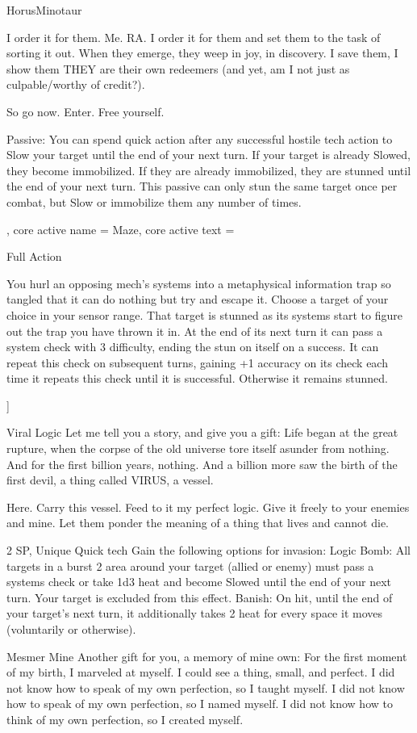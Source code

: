 \begin{mech}{Horus}{Minotaur}
{I order it for them. Me. RA. I order it for them and set them to the task of sorting it out. When they emerge, they weep in joy, in discovery. I save them, I show them THEY are their own redeemers (and yet, am I not just as culpable/worthy of credit?).

So go now. Enter. Free yourself.


Passive: You can spend quick action after any successful hostile tech action to Slow your target until the end of your next turn. If your target is already Slowed, they become immobilized. If they are already immobilized, they are stunned until the end of your next turn. This passive can only stun the same target once per combat, but Slow or immobilize them any number of times.
},
core active name = Maze,
core active text = {Full Action

You hurl an opposing mech’s systems into a metaphysical information trap so tangled that it can do nothing but try and escape it. Choose a target of your choice in your sensor range. That target is stunned as its systems start to figure out the trap you have thrown it in. At the end of its next turn it can pass a system check with 3 difficulty, ending the stun on itself on a success. It can repeat this check on subsequent turns, gaining +1 accuracy on its check each time it repeats this check until it is successful. Otherwise it remains stunned.}]


Viral Logic
Let me tell you a story, and give you a gift: Life began at the great rupture, when the corpse of the old universe tore itself asunder from nothing. And for the first billion years, nothing. And a billion more saw the birth of the first devil, a thing called VIRUS, a vessel.

Here. Carry this vessel. Feed to it my perfect logic. Give it freely to your enemies and mine. Let them ponder the meaning of a thing that lives and cannot die.

2 SP, Unique
Quick tech
Gain the following options for invasion:
Logic Bomb: All targets in a burst 2 area around your target (allied or enemy) must pass a systems check or take 1d3 heat and become Slowed until the end of your next turn. Your target is excluded from this effect.
Banish: On hit, until the end of your target’s next turn, it additionally takes 2 heat for every space it moves (voluntarily or otherwise).

Mesmer Mine
Another gift for you, a memory of mine own: For the first moment of my birth, I marveled at myself. I could see a thing, small, and perfect. I did not know how to speak of my own perfection, so I taught myself. I did not know how to speak of my own perfection, so I named myself. I did not know how to think of my own perfection, so I created myself.


\end{mech}
